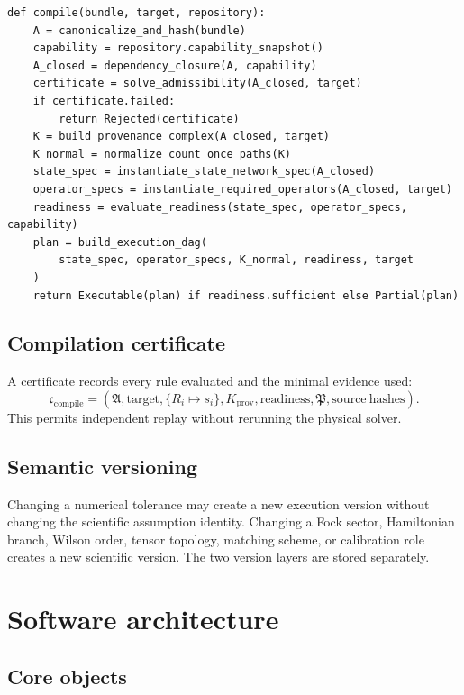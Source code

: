 \documentclass[11pt]{article}
\newcommand{\Aset}{\mathfrak A}
\newcommand{\Pplan}{\mathfrak P}
\newcommand{\Kprov}{K_{\mathrm{prov}}}
\begin{document}
\begin{verbatim}
def compile(bundle, target, repository):
    A = canonicalize_and_hash(bundle)
    capability = repository.capability_snapshot()
    A_closed = dependency_closure(A, capability)
    certificate = solve_admissibility(A_closed, target)
    if certificate.failed:
        return Rejected(certificate)
    K = build_provenance_complex(A_closed, target)
    K_normal = normalize_count_once_paths(K)
    state_spec = instantiate_state_network_spec(A_closed)
    operator_specs = instantiate_required_operators(A_closed, target)
    readiness = evaluate_readiness(state_spec, operator_specs, capability)
    plan = build_execution_dag(
        state_spec, operator_specs, K_normal, readiness, target
    )
    return Executable(plan) if readiness.sufficient else Partial(plan)
\end{verbatim}

\subsection{Compilation certificate}

A certificate records every rule evaluated and the minimal evidence used:
\begin{equation}
 \mathfrak c_{\mathrm{compile}}
 =
 \left(
 \Aset,
 \mathrm{target},
 \{R_i\mapsto s_i\},
 \Kprov,
 \mathrm{readiness},
 \Pplan,
 \mathrm{source\ hashes}
 \right).
\label{eq:compile-certificate}
\end{equation}
This permits independent replay without rerunning the physical solver.

\subsection{Semantic versioning}

Changing a numerical tolerance may create a new execution version without
changing the scientific assumption identity.  Changing a Fock sector,
Hamiltonian branch, Wilson order, tensor topology, matching scheme, or
calibration role creates a new scientific version.  The two version layers are
stored separately.

\section{Software architecture}
\label{sec:software}

\subsection{Core objects}
\end{document}
